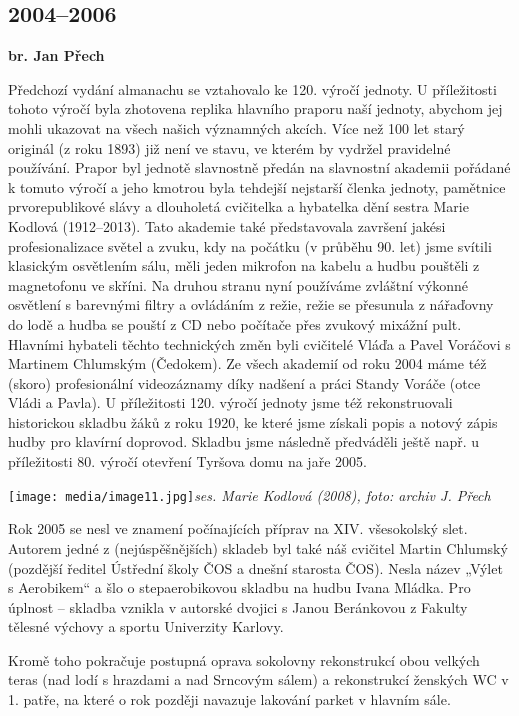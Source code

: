 \subsection{2004--2006}\label{section}

\textbf{br. Jan Přech}

Předchozí vydání almanachu se vztahovalo ke 120. výročí jednoty. U
příležitosti tohoto výročí byla zhotovena replika hlavního praporu naší
jednoty, abychom jej mohli ukazovat na všech našich významných akcích.
Více než 100 let starý originál (z roku 1893) již není ve stavu, ve
kterém by vydržel pravidelné používání. Prapor byl jednotě slavnostně
předán na slavnostní akademii pořádané k tomuto výročí a jeho kmotrou
byla tehdejší nejstarší členka jednoty, pamětnice prvorepublikové slávy
a dlouholetá cvičitelka a hybatelka dění sestra Marie Kodlová
(1912--2013). Tato akademie také představovala završení jakési
profesionalizace světel a zvuku, kdy na počátku (v průběhu 90. let) jsme
svítili klasickým osvětlením sálu, měli jeden mikrofon na kabelu a hudbu
pouštěli z magnetofonu ve skříni. Na druhou stranu nyní používáme
zvláštní výkonné osvětlení s barevnými filtry a ovládáním z režie, režie
se přesunula z nářaďovny do lodě a hudba se pouští z CD nebo počítače
přes zvukový mixážní pult. Hlavními hybateli těchto technických změn
byli cvičitelé Vláďa a Pavel Voráčovi s Martinem Chlumským (Čedokem). Ze
všech akademií od roku 2004 máme též (skoro) profesionální videozáznamy
díky nadšení a práci Standy Voráče (otce Vládi a Pavla). U příležitosti
120. výročí jednoty jsme též rekonstruovali historickou skladbu žáků z
roku 1920, ke které jsme získali popis a notový zápis hudby pro klavírní
doprovod. Skladbu jsme následně předváděli ještě např. u příležitosti
80. výročí otevření Tyršova domu na jaře 2005.

\texttt{[image: media/image11.jpg]}\emph{ses.
Marie Kodlová (2008), foto: archiv J. Přech}

Rok 2005 se nesl ve znamení počínajících příprav na XIV. všesokolský
slet. Autorem jedné z (nejúspěšnějších) skladeb byl také náš cvičitel
Martin Chlumský (pozdější ředitel Ústřední školy ČOS a dnešní starosta
ČOS). Nesla název „Výlet s Aerobikem`` a šlo o stepaerobikovou skladbu
na hudbu Ivana Mládka. Pro úplnost -- skladba vznikla v autorské dvojici
s Janou Beránkovou z Fakulty tělesné výchovy a sportu Univerzity
Karlovy.

Kromě toho pokračuje postupná oprava sokolovny rekonstrukcí obou velkých
teras (nad lodí s hrazdami a nad Srncovým sálem) a rekonstrukcí ženských
WC v 1. patře, na které o rok později navazuje lakování parket v hlavním
sále.

